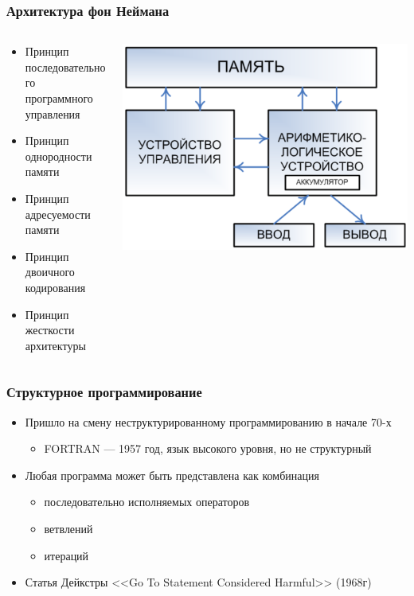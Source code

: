 \documentclass[xetex,mathserif,serif]{beamer}
\begin{document}
	\begin{frame}
		\frametitle{Архитектура фон Неймана}
		\begin{columns}
			\begin{column}{0.6\textwidth}
				\begin{itemize}
					\item Принцип последовательного программного управления
					\item Принцип однородности памяти
					\item Принцип адресуемости памяти
					\item Принцип двоичного кодирования
					\item Принцип жесткости архитектуры
				\end{itemize}
			\end{column}
			\begin{column}{0.4\textwidth}
				\begin{center}
					\includegraphics[width=\textwidth]{vonNeumannArchitecture.png}
				\end{center}
			\end{column}
		\end{columns}
	\end{frame}

	\begin{frame}
		\frametitle{Структурное программирование}
		\begin{itemize}
			\item Пришло на смену неструктурированному программированию в начале 70-х
			\begin{itemize}
				\item FORTRAN --- 1957 год, язык высокого уровня, но не структурный
			\end{itemize}
			\item Любая программа может быть представлена как комбинация
			\begin{itemize}
				\item последовательно исполняемых операторов
				\item ветвлений
				\item итераций
			\end{itemize}
			\item Статья Дейкстры <<Go To Statement Considered Harmful>> (1968г)
		\end{itemize}
	\end{frame}
\end{document}
